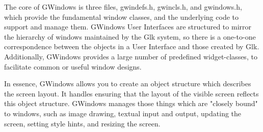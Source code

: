 The core of GWindows is three files, gwindefs.h, gwincls.h, and gwindows.h, which provide the fundamental window classes, and the underlying code to support and manage them. GWindows User Interfaces are structured to mirror the hierarchy of windows maintained by the Glk system, so there is a one-to-one correspondence between the objects in a User Interface and those created by Glk. Additionally, GWindows provides a large number of predefined widget-classes, to facilitate common or useful window designs.

In essence, GWindows allows you to create an object structure which describes the screen layout. It handles ensuring that the layout of the visible screen reflects this object structure. GWindows manages those things which are "closely bound" to windows, such as image drawing, textual input and output, updating the screen, setting style hints, and resizing the screen. 
